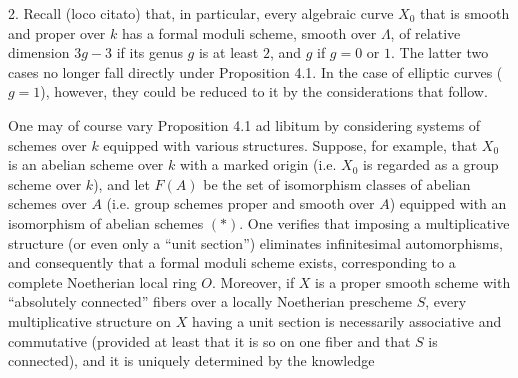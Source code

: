 2. Recall (loco citato) that, in particular, every algebraic curve $X_0$ that
is smooth and proper over $k$ has a formal moduli scheme, smooth over
$\Lambda$, of relative dimension $3g-3$ if its genus $g$ is at least $2$, and
$g$ if $g=0$ or $1$. The latter two cases no longer fall directly under
Proposition 4.1. In the case of elliptic curves ($g=1$), however, they could be
reduced to it by the considerations that follow.

One may of course vary Proposition 4.1 ad libitum by considering systems of
schemes over $k$ equipped with various structures. Suppose, for example, that
$X_0$ is an abelian scheme over $k$ with a marked origin (i.e. $X_0$ is
regarded as a group scheme over $k$), and let $F(A)$ be the set of isomorphism
classes of abelian schemes over $A$ (i.e. group schemes proper and smooth over
$A$) equipped with an isomorphism of abelian schemes $(*)$. One verifies that
imposing a multiplicative structure (or even only a “unit section”) eliminates
infinitesimal automorphisms, and consequently that a formal moduli scheme
exists, corresponding to a complete Noetherian local ring $O$. Moreover, if
$X$ is a proper smooth scheme with “absolutely connected” fibers over a locally
Noetherian prescheme $S$, every multiplicative structure on $X$ having a unit
section is necessarily associative and commutative (provided at least that it
is so on one fiber and that $S$ is connected), and it is uniquely determined
by the knowledge

